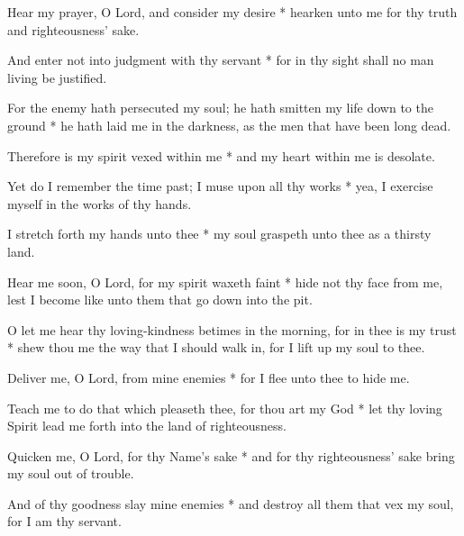 Hear my prayer, O Lord, and consider my desire * hearken unto me for thy truth and righteousness' sake.

And enter not into judgment with thy servant * for in thy sight shall no man living be justified.

For the enemy hath persecuted my soul; he hath smitten my life down to the ground * he hath laid me in the darkness, as the men that have been long dead.

Therefore is my spirit vexed within me * and my heart within me is desolate.

Yet do I remember the time past; I muse upon all thy works * yea, I exercise myself in the works of thy hands.

I stretch forth my hands unto thee * my soul graspeth unto thee as a thirsty land.

Hear me soon, O Lord, for my spirit waxeth faint * hide not thy face from me, lest I become like unto them that go down into the pit.

O let me hear thy loving-kindness betimes in the morning, for in thee is my trust * shew thou me the way that I should walk in, for I lift up my soul to thee.

Deliver me, O Lord, from mine enemies * for I flee unto thee to hide me.

Teach me to do that which pleaseth thee, for thou art my God * let thy loving Spirit lead me forth into the land of righteousness.

Quicken me, O Lord, for thy Name's sake * and for thy righteousness' sake bring my soul out of trouble.

And of thy goodness slay mine enemies * and destroy all them that vex my soul, for I am thy servant.